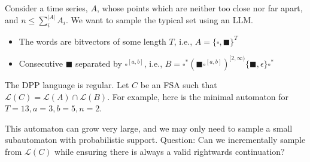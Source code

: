 \documentclass[portrait,a0b,final,a4resizeable]{a0poster}
\def\jointspacing{\vspace{0.3in}}
\newcommand{\bs}{\blacksquare}
\newcommand{\ws}{\square}
\begin{document}
\begin{poster}
\begin{multicols}{2}
    \jointspacing


      \jointspacing

      \hspace*{2cm}\begin{minipage}[c]{0.90\columnwidth}
      Consider a time series, $A$, whose points which are neither too close nor far apart, and $n \leq \sum_i^{|A|} A_i$. We want to sample the typical set using an LLM.\vspace{0.5cm}
\begin{itemize}[leftmargin=2cm]
\item The words are bitvectors of some length $T$, i.e., $A = \{\ws, \bs\}^T$
\item Consecutive $\bs$ separated by $\ws^{[a,b]}$, i.e., $B = \ws^*(\bs\ws^{[a, b]})^{[2,\infty)}\{\bs,\epsilon\}\ws^*$
\end{itemize}\vspace{0.5cm}

The DPP language is regular. Let $C$ be an FSA such that $\mathcal{L}(C) = \mathcal{L}(A) \cap \mathcal{L}(B)$. For example, here is the minimal automaton for $T=13, a=3, b=5, n=2$.
      \end{minipage}

\jointspacing

\hspace{5cm}

\jointspacing

      \hspace*{2cm}\begin{minipage}[c]{0.90\columnwidth}
This automaton can grow very large, and we may only need to sample a small subautomaton with probabilistic support.
Question: Can we incrementally sample from $\mathcal{L}(C)$ while ensuring there is always a valid rightwards continuation?
\vspace{2cm}
      \end{minipage}


\end{multicols}
\end{poster}
\end{document}
